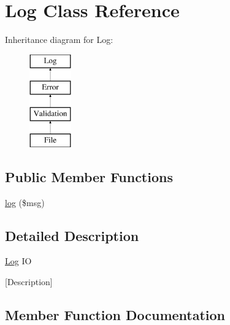 \hypertarget{class_w_a_f_f_l_e_1_1_framework_1_1_i_o_1_1_log}{}\section{Log Class Reference}
\label{class_w_a_f_f_l_e_1_1_framework_1_1_i_o_1_1_log}
Inheritance diagram for Log\+:\begin{figure}[H]
\begin{center}
\leavevmode
\includegraphics[height=4.000000cm]{class_w_a_f_f_l_e_1_1_framework_1_1_i_o_1_1_log}
\end{center}
\end{figure}
\subsection*{Public Member Functions}
\begin{DoxyCompactItemize}
\item 
\hyperlink{class_w_a_f_f_l_e_1_1_framework_1_1_i_o_1_1_log_a3e3c415ada57f553ac4a39a40051c94f}{log} (\$msg)
\end{DoxyCompactItemize}


\subsection{Detailed Description}
\hyperlink{class_w_a_f_f_l_e_1_1_framework_1_1_i_o_1_1_log}{Log} IO

\mbox{[}Description\mbox{]} 

\subsection{Member Function Documentation}
\mbox{\label{class_w_a_f_f_l_e_1_1_framework_1_1_i_o_1_1_log_a3e3c415ada57f553ac4a39a40051c94f}} 

